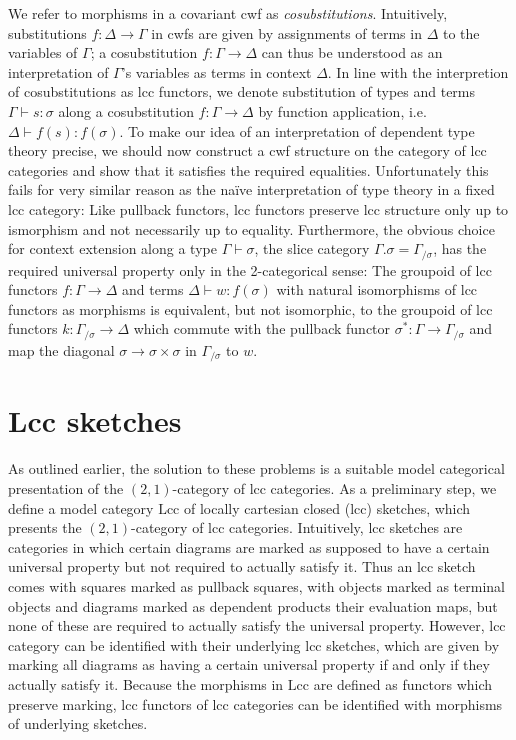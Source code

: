 \documentclass{article}
\begin{document}
We refer to morphisms in a covariant cwf as \emph{cosubstitutions}.
Intuitively, substitutions $f : \Delta \rightarrow \Gamma$ in cwfs are given by assignments of terms in $\Delta$ to the variables of $\Gamma$; a cosubstitution $f : \Gamma \rightarrow \Delta$ can thus be understood as an interpretation of $\Gamma$'s variables as terms in context $\Delta$.
In line with the interpretion of cosubstitutions as lcc functors, we denote substitution of types and terms $\Gamma \vdash s : \sigma$ along a cosubstitution $f : \Gamma \rightarrow \Delta$ by function application, i.e.\@ $\Delta \vdash f(s) : f(\sigma)$.
To make our idea of an interpretation of dependent type theory precise, we should now construct a cwf structure on the category of lcc categories and show that it satisfies the required equalities.
Unfortunately this fails for very similar reason as the naïve interpretation of type theory in a fixed lcc category:
Like pullback functors, lcc functors preserve lcc structure only up to ismorphism and not necessarily up to equality.
Furthermore, the obvious choice for context extension along a type $\Gamma \vdash \sigma$, the slice category $\Gamma.\sigma = \Gamma_{/ \sigma}$, has the required universal property only in the 2-categorical sense:
The groupoid of lcc functors $f : \Gamma \rightarrow \Delta$ and terms $\Delta \vdash w : f(\sigma)$ with natural isomorphisms of lcc functors as morphisms is equivalent, but not isomorphic, to the groupoid of lcc functors $k : \Gamma_{/ \sigma} \rightarrow \Delta$ which commute with the pullback functor $\sigma^* : \Gamma \rightarrow \Gamma_{/ \sigma}$ and map the diagonal $\sigma \rightarrow \sigma \times \sigma$ in $\Gamma_{/ \sigma}$ to $w$.

\section{Lcc sketches}
\label{sec:lcc-sketches}

As outlined earlier, the solution to these problems is a suitable model categorical presentation of the $(2, 1)$-category of lcc categories.
As a preliminary step, we define a model category $\mathrm{Lcc}$ of locally cartesian closed (lcc) sketches, which presents the $(2, 1)$-category of lcc categories.
Intuitively, lcc sketches are categories in which certain diagrams are marked as supposed to have a certain universal property but not required to actually satisfy it.
Thus an lcc sketch comes with squares marked as pullback squares, with objects marked as terminal objects and diagrams marked as dependent products their evaluation maps, but none of these are required to actually satisfy the universal property.
However, lcc category can be identified with their underlying lcc sketches, which are given by marking all diagrams as having a certain universal property if and only if they actually satisfy it.
Because the morphisms in $\mathrm{Lcc}$ are defined as functors which preserve marking, lcc functors of lcc categories can be identified with morphisms of underlying sketches.
\end{document}
